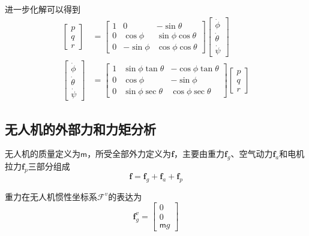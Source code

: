 进一步化解可以得到
\begin{align}
	\begin{bmatrix} p \\ q \\ r \end{bmatrix}  &=   \begin{bmatrix}
		1 &  0   & -\sin \theta      \\
		0 &  \cos \phi  & \sin \phi \cos \theta \\	
		0 & -\sin \phi   & \cos \phi \cos \theta
	\end{bmatrix} \begin{bmatrix} \dot{\phi} \\ \dot{\theta} \\ \dot{\psi} \end{bmatrix} \\
	\begin{bmatrix} \dot{\phi} \\ \dot{\theta} \\ \dot{\psi} \end{bmatrix}  &=  \begin{bmatrix}
		1 &  \sin \phi \tan \theta  & - \cos \phi \tan \theta      \\
		0 & \cos \phi   & -\sin \phi \\
		0  & \sin \phi \sec \theta & \cos \phi \sec \theta
	\end{bmatrix} \begin{bmatrix} p \\ q \\ r \end{bmatrix}
\end{align}

\subsection{无人机的外部力和力矩分析}
无人机的质量定义为$\mathsf{m}$，所受全部外力定义为$\mathbf{f}$，主要由重力$\mathbf{f}_g$、空气动力$\mathbf{f}_a$和电机拉力$\mathbf{f}_p$三部分组成
\begin{equation}
	\mathbf{f} = \mathbf{f}_g + \mathbf{f}_a + \mathbf{f}_p
\end{equation}

重力在无人机惯性坐标系$\mathcal{F}^v$的表达为
\begin{equation}
	\mathbf{f}_g^v = \begin{bmatrix}0  \\ 0  \\ \mathsf{m}g  \end{bmatrix}
\end{equation}

